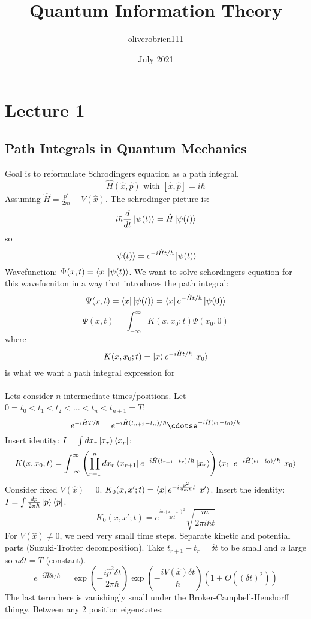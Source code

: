 \documentclass{article}
\title{Quantum Information Theory}
\author{oliverobrien111 }
\date{July 2021}
\begin{document}
\maketitle

\section{Lecture 1}
\subsection{Path Integrals in Quantum Mechanics}
Goal is to reformulate Schrodingers equation as a path integral.
$$
\hat H(\hat x, \hat p) \text{ with } [\hat x , \hat p] = i \hbar
$$
Assuming $\hat H = \frac{\hat p^2}{2m} + V(\hat x)$. The schrodinger picture is:
$$
i \hbar \frac{d}{dt} \ket{\psi(t)} = \hat H \ket{\psi(t)}
$$
so
$$
\ket{\psi(t)} = e^{-i \hat H t/\hbar} \ket{\psi(t)}
$$
Wavefunction: $\Psi(x,t) = \bra{x} \ket{\psi(t)}$. We want to solve schordingers equation for this wavefucniton in a way that introduces the path integral:
$$
\Psi(x,t) = \bra{x} \ket{\psi(t)} = \bra{x} e^{- \hat H t/\hbar} \ket{\psi(0)}
$$
$$
\Psi(x,t) = \int_{-\infty}^{\infty} K(x, x_0;t) \Psi(x_0, 0)
$$
where
$$
K(x, x_0;t) = \ket{x} e^{-i \hat Ht/ \hbar} \ket{x_0}
$$
is what we want a path integral expression for\\\\
Lets consider $n$ intermediate times/positions. Let $0 =t_0 <t_1 < t_2 <\ldots < t_n < t_{n+1} = T$:
$$
e^{-i \hat H T/\hbar} = e^{-i \hat H(t_{n+1}-t_n)/\hbar}\cdotse^{-i \hat H(t_{1}-t_0)/\hbar}
$$
Insert identity: $I = \int dx_r \ket{x_r}\bra{x_r}$:
$$
K(x, x_0;t) = \int_{-\infty}^{\infty} \left( \prod_{r=1}^n dx_r \bra{x_{r+1}}e^{-i\hat H(t_{r+1}-t_r)/\hbar} \ket{x_r}\right) \bra{x_1} e^{-i\hat H(t_1 - t_0)/\hbar} \ket{x_0}
$$
Consider fixed $V(\hat x) =0$. $K_0(x, x'; t) = \bra{x} e^{-i \frac{ \hat p^2}{2m \hbar} t} \ket{x'}$. Insert the identity: $I = \int \frac{dp}{2\pi \hbar} \ket{p}\bra{p}$.
$$
K_0(x,x';t) = e^{\frac{im(x-x')^2}{2 \hbar t}} \sqrt{\frac{m}{2\pi i \hbar t}}
$$
For $V(\hat x) \neq 0$, we need very small time steps. Separate kinetic and potential parts (Suzuki-Trotter decomposition). Take $t_{r+1} - t_r = \delta t$ to be small and $n$ large so $n\delta t = T$ (constant).
$$
e^{-i \hat H \delta t / \hbar} = \exp( - \frac{i \hat p^2 \delta t}{2\pi \hbar}) \exp( - \frac{iV(\hat x) \delta t}{\hbar}) ( 1+ O((\delta t)^2))
$$
The last term here is vanishingly small under the Broker-Campbell-Henshorff thingy. Between any 2 position eigenstates:
\end{document}

